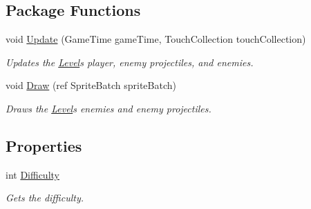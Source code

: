 \subsection*{Package Functions}
\begin{DoxyCompactItemize}
\item 
void \hyperlink{classXaria_1_1Level_a0591034ea9fd9f955a4bf7ceb698c2a4}{Update} (Game\+Time game\+Time, Touch\+Collection touch\+Collection)
\begin{DoxyCompactList}\small\item\em Updates the \hyperlink{classXaria_1_1Level}{Level}\textquotesingle{}s player, enemy projectiles, and enemies. \end{DoxyCompactList}\item 
void \hyperlink{classXaria_1_1Level_a09298652a8048fff78f5497b08c51a16}{Draw} (ref Sprite\+Batch sprite\+Batch)
\begin{DoxyCompactList}\small\item\em Draws the \hyperlink{classXaria_1_1Level}{Level}\textquotesingle{}s enemies and enemy projectiles. \end{DoxyCompactList}\end{DoxyCompactItemize}
\subsection*{Properties}
\begin{DoxyCompactItemize}
\item 
int \hyperlink{classXaria_1_1Level_a088431ceff97978eb6b0c9aae95ccfd2}{Difficulty}
\begin{DoxyCompactList}\small\item\em Gets the difficulty. \end{DoxyCompactList}\end{DoxyCompactItemize}
